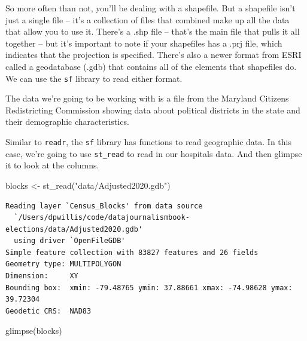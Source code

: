 \documentclass[
  letterpaper,
  DIV=11,
  numbers=noendperiod]{scrreprt}
\newenvironment{Shaded}{\begin{snugshade}}{\end{snugshade}}
\newcommand{\FunctionTok}[1]{\textcolor[rgb]{0.28,0.35,0.67}{#1}}
\newcommand{\NormalTok}[1]{\textcolor[rgb]{0.00,0.23,0.31}{#1}}
\newcommand{\OtherTok}[1]{\textcolor[rgb]{0.00,0.23,0.31}{#1}}
\newcommand{\StringTok}[1]{\textcolor[rgb]{0.13,0.47,0.30}{#1}}
\begin{document}
So more often than not, you'll be dealing with a shapefile. But a
shapefile isn't just a single file -- it's a collection of files that
combined make up all the data that allow you to use it. There's a .shp
file -- that's the main file that pulls it all together -- but it's
important to note if your shapefiles has a .prj file, which indicates
that the projection is specified. There's also a newer format from ESRI
called a geodatabase (.gdb) that contains all of the elements that
shapefiles do. We can use the \texttt{sf} library to read either format.

The data we're going to be working with is a file from the Maryland
Citizens Redistricting Commission showing data about political districts
in the state and their demographic characteristics.

Similar to \texttt{readr}, the \texttt{sf} library has functions to read
geographic data. In this case, we're going to use \texttt{st\_read} to
read in our hospitals data. And then glimpse it to look at the columns.

\begin{Shaded}
\begin{Highlighting}[]
\NormalTok{blocks }\OtherTok{\textless{}{-}} \FunctionTok{st\_read}\NormalTok{(}\StringTok{"data/Adjusted2020.gdb"}\NormalTok{)}
\end{Highlighting}
\end{Shaded}

\begin{verbatim}
Reading layer `Census_Blocks' from data source 
  `/Users/dpwillis/code/datajournalismbook-elections/data/Adjusted2020.gdb' 
  using driver `OpenFileGDB'
Simple feature collection with 83827 features and 26 fields
Geometry type: MULTIPOLYGON
Dimension:     XY
Bounding box:  xmin: -79.48765 ymin: 37.88661 xmax: -74.98628 ymax: 39.72304
Geodetic CRS:  NAD83
\end{verbatim}

\begin{Shaded}
\begin{Highlighting}[]
\FunctionTok{glimpse}\NormalTok{(blocks)}
\end{Highlighting}
\end{Shaded}
\end{document}
